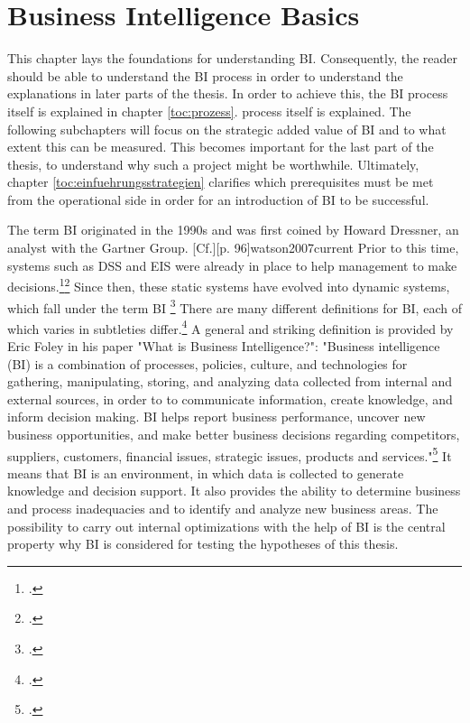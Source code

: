 \newpage
\section{Business Intelligence Basics} \label{toc:grundlagenbusinessintelligence}

This chapter lays the foundations for understanding \ac{BI}. Consequently, the reader should be able to understand the
\ac{BI} process in order to understand the explanations in later parts of the thesis. In order to achieve this,
the \ac{BI} process itself is explained in chapter \ref{toc:prozess}. process itself is explained. The following subchapters will focus on the
strategic added value of \ac{BI} and to what extent this can be measured. This becomes important for the last part of the thesis,
to understand why such a project might be worthwhile. Ultimately, chapter \ref{toc:einfuehrungsstrategien}
clarifies which prerequisites must be met from the operational side in order for an introduction of BI to be successful.

The term \ac{BI} originated in the 1990s and was first coined by Howard Dressner, an analyst with the Gartner Group.
[Cf.][p. 96]{watson2007current} Prior to this time, systems such as \ac{DSS} and \ac{EIS} were already in place to help management
to make decisions.\footcite[Cf.][p. 1]{foley2010business}\footcite[Cf.][p. 19]{niu2009cognition}
Since then, these static systems have evolved into dynamic systems, which fall under the term \ac{BI}
\footcite[Cf.][p. 26]{yeoh2010critical} There are many different definitions for \ac{BI}, each of which varies in subtleties
differ.\footcite[Cf.][p. 114]{muntean2013agile} A general and striking definition is provided by Eric Foley in his paper
"What is Business Intelligence?": "Business intelligence (BI) is a combination of processes, policies, culture, and
technologies for gathering, manipulating, storing, and analyzing data collected from internal and external sources, in order to
to communicate information, create knowledge, and inform decision making. BI helps report business performance, uncover new
business opportunities, and make better business decisions regarding competitors, suppliers, customers, financial issues,
strategic issues, products and services."\footcite[][p. 4]{foley2010business} It means that \ac{BI} is an environment,
in which data is collected to generate knowledge and decision support. It also provides the ability to determine
business and process inadequacies and to identify and analyze new business areas.
The possibility to carry out internal optimizations with the help of \ac{BI} is the central
property why \ac{BI} is considered for testing the hypotheses of this thesis.

